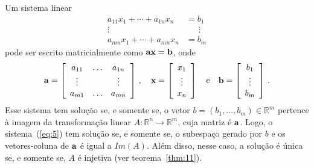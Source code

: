 \documentclass[12pt,a4paper]{article}
\newcommand{\dsqr}[1]{\left[#1\right]}
\newcommand{\R}{\mathbb{R}}
\theoremstyle{definition}
\begin{document}
Um sistema linear
\begin{equation}
  \label{eq:5}
  \begin{split}
    a_{11}x_1+\cdots+a_{1n}x_n&=b_1\\
    \vdots\qquad\qquad&\quad\,\,\,\vdots\\
    a_{mn}x_1+\cdots+a_{mn}x_n&=b_m
  \end{split}
\end{equation}
pode ser escrito matricialmente como ${\bf a}{\bf x}={\bf b}$, onde
$${\bf a}=\dsqr{
  \begin{array}{ccc}
    a_{11}&\ldots&a_{1n}\\
    \vdots&&\vdots\\
    a_{m1}&\ldots&a_{mn}
  \end{array}
}\,,\quad {\bf x}=\dsqr{
  \begin{array}{c}
    x_1\\
    \vdots\\
    x_n
  \end{array}
}\quad\text{e}\quad {\bf b}=\dsqr{
  \begin{array}{c}
    b_1\\
    \vdots\\
    b_m
  \end{array}
}\,.$$ Esse sistema tem solução se, e somente se, o vetor
$b=(b_1,\ldots,b_m)\in\R^m$ pertence à imagem da transformação linear
$A:\R^n\to\R^m$, cuja matriz é ${\bf a}$. Logo, o sistema~(\ref{eq:5})
tem solução se, e somente se, o subespaço gerado por $b$ e os
vetores-coluna de ${\bf a}$ é igual a $Im(A)$. Além disso, nesse caso,
a solução é única se, e somente se, $A$ é injetiva (ver
teorema~\ref{thm:11}).
\end{document}
